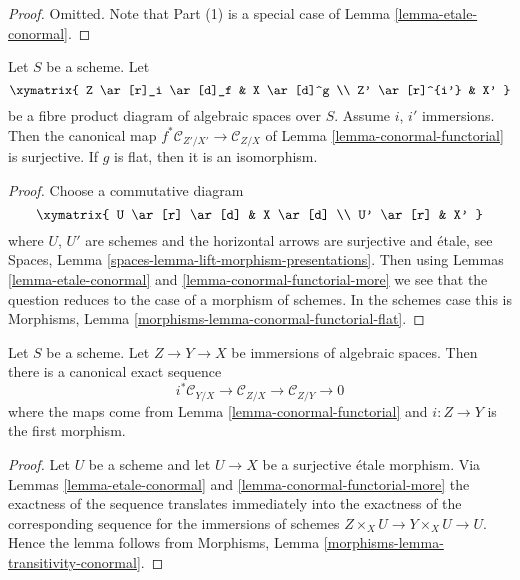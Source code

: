 \begin{proof}
Omitted. Note that Part (1) is a special case of
Lemma \ref{lemma-etale-conormal}.
\end{proof}

\begin{lemma}
\label{lemma-conormal-functorial-flat}
Let $S$ be a scheme. Let
$$
\xymatrix{
Z \ar[r]_i \ar[d]_f & X \ar[d]^g \\
Z' \ar[r]^{i'} & X'
}
$$
be a fibre product diagram of algebraic spaces over $S$. Assume
$i$, $i'$ immersions. Then the canonical map
$f^*\mathcal{C}_{Z'/X'} \to \mathcal{C}_{Z/X}$ of
Lemma \ref{lemma-conormal-functorial}
is surjective. If $g$ is flat, then it is an isomorphism.
\end{lemma}

\begin{proof}
Choose a commutative diagram
$$
\xymatrix{
U \ar[r] \ar[d] & X \ar[d] \\
U' \ar[r] & X'
}
$$
where $U$, $U'$ are schemes and the horizontal arrows are surjective
and \'etale, see
Spaces, Lemma \ref{spaces-lemma-lift-morphism-presentations}.
Then using
Lemmas \ref{lemma-etale-conormal} and \ref{lemma-conormal-functorial-more}
we see that the question reduces to the case of a morphism of schemes.
In the schemes case this is
Morphisms, Lemma \ref{morphisms-lemma-conormal-functorial-flat}.
\end{proof}

\begin{lemma}
\label{lemma-transitivity-conormal}
Let $S$ be a scheme.
Let $Z \to Y \to X$ be immersions of algebraic spaces.
Then there is a canonical exact sequence
$$
i^*\mathcal{C}_{Y/X} \to
\mathcal{C}_{Z/X} \to
\mathcal{C}_{Z/Y} \to 0
$$
where the maps come from
Lemma \ref{lemma-conormal-functorial}
and $i : Z \to Y$ is the first morphism.
\end{lemma}

\begin{proof}
Let $U$ be a scheme and let $U \to X$ be a surjective \'etale morphism. Via
Lemmas \ref{lemma-etale-conormal} and \ref{lemma-conormal-functorial-more}
the exactness of the sequence translates immediately into the
exactness of the corresponding sequence for the immersions of schemes
$Z \times_X U \to Y \times_X U \to U$. Hence the lemma follows from
Morphisms, Lemma \ref{morphisms-lemma-transitivity-conormal}.
\end{proof}








